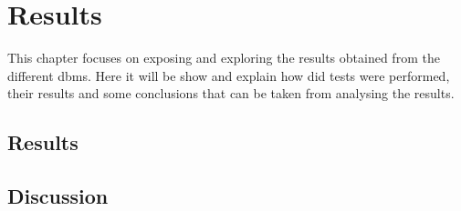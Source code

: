 \newcommand{\novathesis}{\emph{novathesis}}
\newcommand{\novathesisclass}{\texttt{novathesis.cls}}

\chapter{Results}
\label{cha:Results}


This chapter focuses on exposing and exploring the results obtained from the different \gls{dbms}. Here it will be show and explain how did tests were performed, their results and some conclusions that can be taken from analysing the results.


\section{Results}


\section{Discussion}



